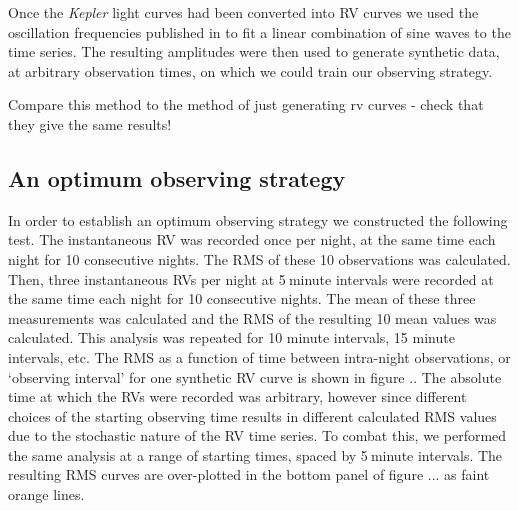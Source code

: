 \documentclass[useAMS, usenatbib]{aastex}
\newcommand{\integer}{5}
\begin{document}
Once the {\it Kepler} light curves had been converted into RV curves we
used the oscillation frequencies published in \citet{Appourchaux2012}
to fit a linear combination of sine waves to the time series.
The resulting amplitudes were then used to generate synthetic data, at
arbitrary observation times, on which we could train our observing strategy.

Compare this method to the method of just generating rv curves -
check that they give the same results!

%


\subsection{An optimum observing strategy}
\label{sub:optimum}

In order to establish an optimum observing strategy we constructed the
following test.
The instantaneous RV was recorded once per night, at the same time each night
for 10 consecutive nights.
The RMS of these 10 observations was calculated.
Then, three instantaneous RVs per night at \integer$~$minute intervals were
recorded at the same time each night for 10 consecutive nights.
The mean of these three measurements was calculated and the RMS of the
resulting 10 mean values was calculated.
This analysis was repeated for 10 minute intervals, 15 minute intervals, etc.
The RMS as a function of time between intra-night observations, or
`observing interval' for one synthetic RV curve is shown in figure ..
The absolute time at which the RVs were recorded was arbitrary, however since
different choices of the starting observing time results in different
calculated RMS values due to the stochastic nature of the RV time series.
To combat this, we performed the same analysis at a range of
starting times, spaced by \integer$~$minute intervals.
The resulting RMS curves are over-plotted in the bottom panel of figure ...
as faint orange lines.
\end{document}
